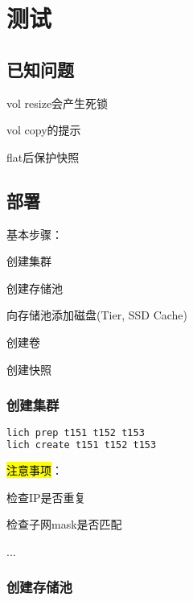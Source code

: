 \chapter{测试}


\section{已知问题}

\begin{enumbox}
\item vol resize会产生死锁
\item vol copy的提示
\item flat后保护快照
\end{enumbox}

\section{部署}

基本步骤：
\begin{enumbox}
\item 创建集群
\item 创建存储池
\item 向存储池添加磁盘(Tier, SSD Cache)
\item 创建卷
\item 创建快照
\end{enumbox}

\subsection{创建集群}

\begin{lstlisting}[language=bash]
lich prep t151 t152 t153
lich create t151 t152 t153
\end{lstlisting}

\hl{注意事项}：
\begin{compactenum}
\item 检查IP是否重复
\item 检查子网mask是否匹配
\item ...
\end{compactenum}

\subsection{创建存储池}

